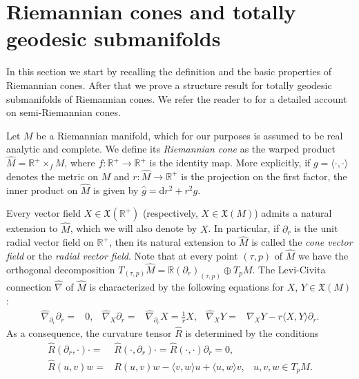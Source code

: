 \documentclass[11pt,a4paper,final]{amsart}
\newcommand{\g}{\mathfrak}
\newcommand{\R}{\mathbb{R}}
\renewcommand{\hat}{\widehat}
\theoremstyle{definition}
\begin{document}
\section{Riemannian cones and totally geodesic submanifolds}\label{sec:tgcones}

In this section we start by recalling the definition and the basic properties of Riemannian cones.
After that we prove a structure result for totally geodesic submanifolds of Riemannian cones.
We refer the reader to \cite{Leistner} for a detailed account on semi-Riemannian cones.

Let $M$ be a Riemannian manifold, which for our purposes is assumed to be real analytic and complete.
We define its \textit{Riemannian cone} as the warped product $\hat{M}=\R^{+}\times_{f} M$, where $f\colon \R^{+}\to\R^{+}$ is the identity map.
More explicitly, if $g=\langle\cdot,\cdot\rangle$ denotes the metric on $M$ and $r\colon \hat{M}\to\R^{+}$ is the projection on the first factor, the inner product on $\hat{M}$ is given by $\hat{g}=\mathrm{d}r^{2}+r^{2}g$.
	
Every vector field $X\in \g{X}(\R^{+})$ (respectively, $X\in \g{X}(M)$) admits a natural extension to $\hat{M}$, which we will also denote by $X$.
In particular, if $\partial_{r}$ is the unit radial vector field on $\R^{+}$, then its natural extension to $\hat{M}$ is called the \textit{cone vector field} or the \textit{radial vector field}.
Note that at every point $(\tau,p)$ of $\hat{M}$ we have the orthogonal decomposition $T_{(\tau,p)}\hat{M}=\R(\partial_{r})_{(\tau,p)}\oplus T_{p}M$.
The Levi-Civita connection $\hat{\nabla}$ of $\hat{M}$ is characterized by the following equations for $X$, $Y\in \g{X}(M)$:
\begin{equation}\label{eq:ConeConnection}
	\begin{aligned}
		\hat{\nabla}_{\partial_{r}} \partial_{r}={}& 0, & \hat{\nabla}_{X}\partial_{r}={}&\hat{\nabla}_{\partial_{r}}X=\frac{1}{r}X, & \hat{\nabla}_{X}Y{}={}&\nabla_{X}Y-r\langle X,Y\rangle \partial_{r}.
	\end{aligned}
\end{equation}
As a consequence, the curvature tensor $\hat{R}$ is determined by the conditions
\begin{equation}
	\label{eq:curvaturecone}
	\begin{aligned}
		\hat{R}(\partial_{r},\cdot)\cdot={}&\hat{R}(\cdot,\partial_{r})\cdot=\hat{R}(\cdot,\cdot)\partial_{r}=0, \\
		\hat{R}(u,v)w={}&R(u,v)w-\langle v,w\rangle u+\langle u,w\rangle v, & u,v,w\in T_{p}M.
	\end{aligned}	
\end{equation}
\end{document}
